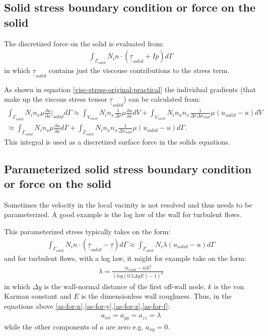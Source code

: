 \subsection{Solid stress boundary condition or force on the solid}

The discretized force on the solid is evaluated from:
\begin{eqnarray}
\int_{\Gamma_{solid}} N_i n\cdot (\underline{\underline{\tau}}_{solid} + I p) d\Gamma
\end{eqnarray}
in which $\underline{\underline{\tau}}_{solid}$ contains just the viscouse contributions
to the stress term.

As shown in equation \ref{visc-stress-original-practical}  the
individual gradients (that make up the viscous stress tensor  $\underline{\underline{\tau}}_{solid}$) can be calculated from:
\begin{eqnarray}
\int_{\Gamma_{solid}}  N_i n_x \mu \frac{\partial u}{\partial x} \vert_{solid} d\Gamma
\approx
\int_{V_{shell}}  N_i n_x \frac{1}{\Delta r}\mu \frac{\partial u}{\partial x}  dV
+
\int_{V_{shell}}  N_i n_x n_x \frac{1}{\Delta r \Delta x_{wall} }\mu (u_{solid} -u)  dV \\
\approx
\int_{\Gamma_{solid}}  N_i n_x \mu \frac{\partial u}{\partial x}  d\Gamma
+
\int_{\Gamma_{solid}}  N_i n_x n_x \frac{1}{\Delta x_{wall}}\mu (u_{solid} -u)  d\Gamma.
\label{visc-stress-original-practical-solid-bc}
\end{eqnarray}
This integral is used as a discretized surface force in the solids equations.






\subsection{Parameterized solid stress boundary condition or force on the solid}
Sometimes the velocity in the local vacinity is not resolved and thus
needs to be parameterized. A good example is the log law of the wall for turbulent
flows.

This parameterized stress typically takes on the form:
\begin{eqnarray}
\int_{\Gamma_{solid}} N_i n\cdot
(  \underline{\underline{\tau}}_{solid} - \underline{\underline{\tau}} )
d\Gamma
\approx
\int_{\Gamma_{solid}} N_i \lambda (u_{solid}-u)  d\Gamma
\end{eqnarray}
and for turbulent flows, with a log law, it might for example take on the form:
\begin{eqnarray}
\lambda = \frac{ \vert u_{solid}-u\vert k^2 } { (log(0.5\Delta y E)-1)^2}
\end{eqnarray}
in which $\Delta y$ is the wall-normal distance
of the first off-wall node, $k$ is the von Karman constant and $E$ is the dimensionless wall roughness.
Thus, in the equations above \ref{as-for-x},\ref{as-for-y},\ref{as-for-z},\ref{as-for-f}:
\begin{eqnarray}
a_{xx}=a_{yy}=a_{zz}=\lambda
\end{eqnarray}
while the other components of $a$ are zero e.g. $a_{xy}=0$.





